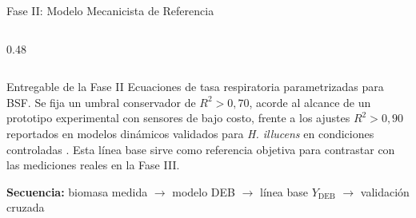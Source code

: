\documentclass[aspectratio=169, 11pt]{beamer}
\begin{document}
\begin{frame}{Fase II: Modelo Mecanicista de Referencia}
\begin{columns}[T,onlytextwidth]
\begin{column}{0.48\textwidth}
\end{column}

\end{columns}

\vspace{0.20cm}

\begin{alertblock}{Entregable de la Fase II}
\scriptsize
Ecuaciones de tasa respiratoria parametrizadas para BSF. Se fija un umbral conservador de $R^2 > 0{,}70$, acorde al alcance de un prototipo experimental con sensores de bajo costo, frente a los ajustes $R^2 > 0{,}90$ reportados en modelos dinámicos validados para \textit{H. illucens} en condiciones controladas \parencite{padmanabhaComprehensiveDynamicGrowth2020}. Esta línea base sirve como referencia objetiva para contrastar con las mediciones reales en la Fase III.
\end{alertblock}

\vspace{0.15cm}
\centering
\scriptsize
\textbf{Secuencia:} biomasa medida $\rightarrow$ modelo DEB $\rightarrow$ línea base $Y_{\text{DEB}}$ $\rightarrow$ validación cruzada
\end{frame}

\end{document}
